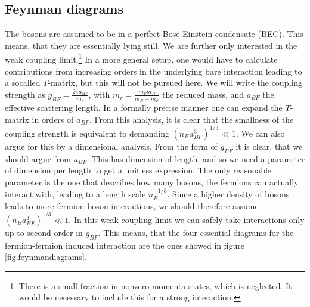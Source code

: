\subsection{Feynman diagrams} \label{subsec.Feynmandiagrams}
The bosons are assumed to be in a perfect Bose-Einstein condensate (BEC). This means, that they are essentially lying still. We are further only interested in the weak coupling limit.\footnote{There is a small fraction in nonzero momenta states, which is neglected. It would be necessary to include this for a strong interaction.} In a more general setup, one would have to calculate contributions from increasing orders in the underlying bare interaction leading to a socalled $T$-matrix, but this will not be pursued here. We will write the coupling strength as $g_{BF} = \frac{2\pi a_{BF}}{m_r}$, with $m_r = \frac{m_Fm_B}{m_B + m_F}$ the reduced mass, and $a_{BF}$ the effective scattering length. In a formally precise manner one can expand the $T$-matrix in orders of $a_{BF}$. From this analysis, it is clear that the smallness of the coupling strength is equivalent to demanding $(n_Ba_{BF}^3)^{1/3}\ll 1$. We can also argue for this by a dimensional analysis. From the form of $g_{BF}$ it is clear, that we should argue from $a_{BF}$. This has dimension of length, and so we need a parameter of dimension per length to get a unitless expression. The only reasonable parameter is the one that describes how many bosons, the fermions can actually interact with, leading to a length scale $n_B^{-1/3}$. Since a higher density of bosons leads to more fermion-boson interactions, we should therefore assume $(n_Ba_{BF}^3)^{1/3} \ll 1$. In this weak coupling limit we can safely take interactions only up to second order in $g_{BF}$. This means, that the four essential diagrams for the fermion-fermion induced interaction are the ones showed in figure \ref{fig.feynmandiagrams}. 

